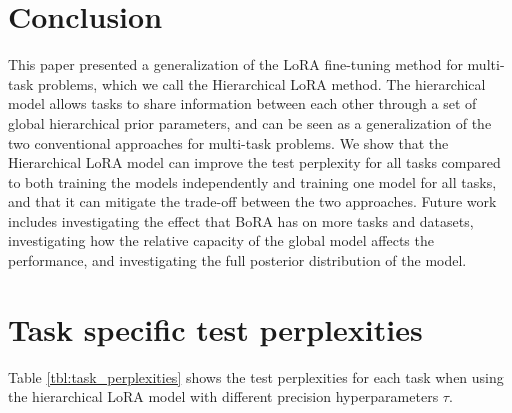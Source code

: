 \documentclass[fullpaper]{nldl}
\begin{document}
\section{Conclusion}
This paper presented a generalization of the LoRA fine-tuning method for multi-task problems, which we call the Hierarchical LoRA method. The hierarchical model allows tasks to share information between each other through a set of global hierarchical prior parameters, and can be seen as a generalization of the two conventional approaches for multi-task problems. We show that the Hierarchical LoRA model can improve the test perplexity for all tasks compared to both training the models independently and training one model for all tasks, and that it can mitigate the trade-off between the two approaches.
Future work includes investigating the effect that BoRA has on more tasks and datasets, investigating how the relative capacity of the global model affects the performance, and investigating the full posterior distribution of the model.

\printbibliography

\appendix
\section{Task specific test perplexities}
Table \ref{tbl:task_perplexities} shows the test perplexities for each task when using the hierarchical LoRA model with different precision hyperparameters $\tau$.
\end{document}
